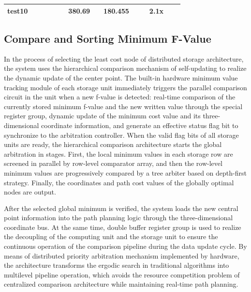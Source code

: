 \documentclass[conference]{IEEEtran}
\begin{document}
\begin{table}[!htbp]
\begin{tabular}{|c|llllc|cccllcll|}
    test10                  & \multicolumn{1}{l|}{}   & \multicolumn{1}{l|}{}   & \multicolumn{1}{l|}{}      & \multicolumn{1}{l|}{}           &         & \multicolumn{1}{c|}{380.69} & \multicolumn{1}{c|}{}   & \multicolumn{1}{c|}{180.455} & \multicolumn{1}{l|}{}           & \multicolumn{1}{l|}{}        & \multicolumn{1}{c|}{2.1x}  & \multicolumn{1}{l|}{}           &                              \\ \hline
    \end{tabular}
    \label{tab:performance between}  %
    \end{table}

\subsection{Compare and Sorting Minimum F-Value }
In the process of selecting the least cost node of distributed storage architecture, the system uses the hierarchical comparison mechanism of self-updating to realize the dynamic update of the center point.
The built-in hardware minimum value tracking module of each storage unit immediately triggers the parallel comparison circuit in the unit when a new f-value is detected: real-time comparison of the currently stored minimum f-value and the new written value through the special register group, dynamic update of the minimum cost value and its three-dimensional coordinate information, and generate an effective status flag bit to synchronize to the arbitration controller.
When the valid flag bits of all storage units are ready, the hierarchical comparison architecture starts the global arbitration in stages. First, the local minimum values in each storage row are screened in parallel by row-level comparator array, and then the row-level minimum values are progressively compared by a tree arbiter based on depth-first strategy. Finally, the coordinates and path cost values of the globally optimal nodes are output.

After the selected global minimum is verified, the system loads the new central point information into the path planning logic through the three-dimensional coordinate bus. At the same time, double buffer register group is used to realize the decoupling of the computing unit and the storage unit to ensure the continuous operation of the comparison pipeline during the data update cycle.
By means of distributed priority arbitration mechanism implemented by hardware, the architecture transforms the ergodic search in traditional algorithms into multilevel pipeline operation, which avoids the resource competition problem of centralized comparison architecture while maintaining real-time path planning.
\end{document}
